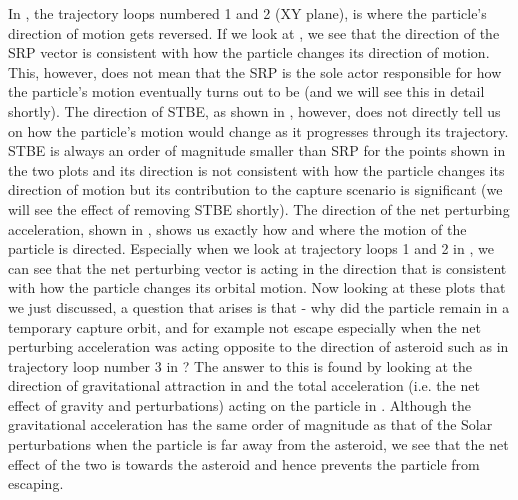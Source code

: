 %
\newline\newline
%
In , the trajectory loops numbered 1 and 2 (XY plane), is where the particle's direction of motion gets reversed. If we look at , we see that the direction of the \gls{SRP} vector is consistent with how the particle changes its direction of motion. This, however, does not mean that the \gls{SRP} is the sole actor responsible for how the particle's motion eventually turns out to be (and we will see this in detail shortly). The direction of \gls{STBE}, as shown in , however, does not directly tell us on how the particle's motion would change as it progresses through its trajectory. \gls{STBE} is always an order of magnitude smaller than \gls{SRP} for the points shown in the two plots and its direction is not consistent with how the particle changes its direction of motion but its contribution to the capture scenario is significant (we will see the effect of removing \gls{STBE} shortly). The direction of the net perturbing acceleration, shown in , shows us exactly how and where the motion of the particle is directed. Especially when we look at trajectory loops 1 and 2 in , we can see that the net perturbing vector is acting in the direction that is consistent with how the particle changes its orbital motion. Now looking at these plots that we just discussed, a question that arises is that - why did the particle remain in a temporary capture orbit, and for example not escape especially when the net perturbing acceleration was acting opposite to the direction of asteroid such as in trajectory loop number 3 in ? The answer to this is found by looking at the direction of gravitational attraction in  and the total acceleration (i.e. the net effect of gravity and perturbations) acting on the particle in . Although the gravitational acceleration has the same order of magnitude as that of the Solar perturbations when the particle is far away from the asteroid, we see that the net effect of the two is towards the asteroid and hence prevents the particle from escaping.
